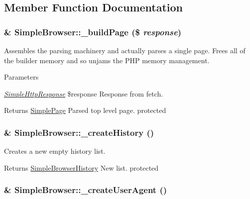 \subsection{Member Function Documentation}
\hypertarget{class_simple_browser_ab669833829037f7d13fc1d5ec0d6399b}{
\subsubsection[{\_\-buildPage}]{\setlength{\rightskip}{0pt plus 5cm}\& SimpleBrowser::\_\-buildPage (\$ {\em response})}}
\label{class_simple_browser_ab669833829037f7d13fc1d5ec0d6399b}
Assembles the parsing machinery and actually parses a single page. Frees all of the builder memory and so unjams the PHP memory management. 
\begin{DoxyParams}{Parameters}
\item[{\em \hyperlink{class_simple_http_response}{SimpleHttpResponse}}]\$response Response from fetch. \end{DoxyParams}
\begin{DoxyReturn}{Returns}
\hyperlink{class_simple_page}{SimplePage} Parsed top level page.  protected 
\end{DoxyReturn}
\hypertarget{class_simple_browser_abaaba39a9acb33bbbe29a9fcc2461da4}{
\subsubsection[{\_\-createHistory}]{\setlength{\rightskip}{0pt plus 5cm}\& SimpleBrowser::\_\-createHistory ()}}
\label{class_simple_browser_abaaba39a9acb33bbbe29a9fcc2461da4}
Creates a new empty history list. \begin{DoxyReturn}{Returns}
\hyperlink{class_simple_browser_history}{SimpleBrowserHistory} New list.  protected 
\end{DoxyReturn}
\hypertarget{class_simple_browser_ac9098377a41772b9eafd3b2d2b3fdbea}{
\subsubsection[{\_\-createUserAgent}]{\setlength{\rightskip}{0pt plus 5cm}\& SimpleBrowser::\_\-createUserAgent ()}}
